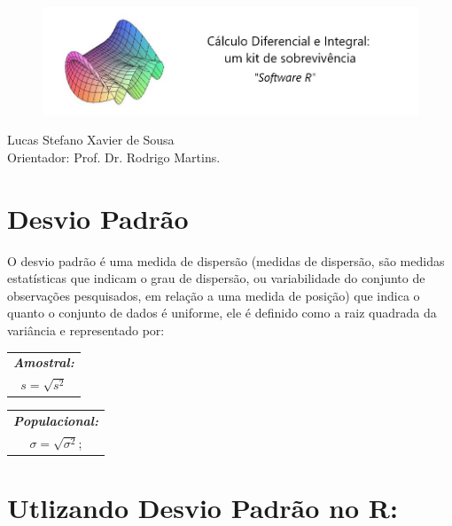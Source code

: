 \documentclass[12pt,a4paper]{article}
\begin{document}
	
\begin{figure}[htb]
	\includegraphics[scale=0.6]{logo.jpg}
\end{figure}

	
	
	\begin{center}Lucas Stefano Xavier de Sousa \\ Orientador: Prof. Dr. Rodrigo Martins.\end{center}
	
	
	\vspace{2cm}
	
	\section*{Desvio Padrão}
	
	O desvio padrão é uma medida de dispersão (medidas de dispersão, são medidas estatísticas que indicam o grau de dispersão, ou variabilidade do conjunto de 
	observações pesquisados, em relação a uma medida de posição) que indica o quanto o conjunto de dados é uniforme, ele é definido como a raiz quadrada da variância
	e representado por:\\
	
	\begin{center}
		\vspace{0.2cm}
		\begin{tabular}{|c|}
			\hline
			\textit{\textbf{Amostral:}} \\
			$s= \sqrt{s^2}$\\
			\hline
		\end{tabular}
	\end{center}
	

	\begin{center}
		\begin{tabular}{|c|}
			\hline
			\textit{\textbf{Populacional:}} \\
			$	\sigma= \sqrt{\sigma^2}$;\\
			\hline
		\end{tabular}
	\end{center}
	
	\section*{Utlizando Desvio Padrão no R:}
	
\end{document}

